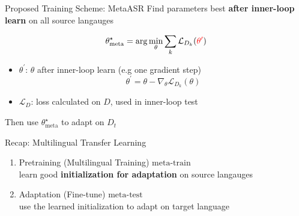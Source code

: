 \documentclass{beamer}
\begin{document}
\begin{frame}{Proposed Training Scheme: MetaASR}
  Find parameters best \textbf{after inner-loop learn} on all source langauges

  \begin{equation*}
    \theta_{\text{meta}}^\star = \arg \min_\theta \sum_k \mathcal{L}_{D_k}(\textcolor{red}{\theta^\prime})
  \end{equation*}
  \begin{itemize}
    \item $\theta^\prime$: $\theta$ after inner-loop learn (e.g one gradient step)
    \begin{equation*}
      \theta^\prime = \theta - \nabla_\theta \mathcal{L}_{D_k}(\theta)
    \end{equation*}
    \item $\mathcal{L}_D$: loss calculated on $D$, used in inner-loop test
  \end{itemize}
  
  Then use $\theta^\star_{\text{meta}}$ to adapt on $D_t$
  
\end{frame}

\begin{frame}[t]{Recap: Multilingual Transfer Learning}

  \begin{enumerate}
    \item Pretraining (Multilingual Training) $\boxed{\text{meta-train}}$ \\ learn good \textbf{initialization for adaptation} on source langauges
    \item Adaptation (Fine-tune) $\boxed{\text{meta-test}}$ \\ use the learned initialization to adapt on target language
  \end{enumerate}
\end{frame}

\end{document}
